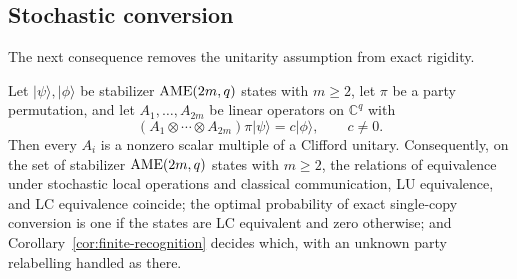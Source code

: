

\subsection{Stochastic conversion}
\label{subsec:stochastic-conversion}

The next consequence removes the unitarity assumption from exact rigidity.

\begin{corollary}
\label{cor:stochastic-conversion}
Let \(\lvert\psi\rangle,\lvert\phi\rangle\) be stabilizer
\(\mathrm{AME}(2m,q)\) states with \(m\geq2\), let \(\pi\) be a party
permutation, and let \(A_1,\ldots,A_{2m}\) be linear operators on
\(\mathbb C^q\) with
\[
 (A_1\otimes\cdots\otimes A_{2m})\pi\lvert\psi\rangle=c\lvert\phi\rangle,
 \qquad c\neq0 .
\]
Then every \(A_i\) is a nonzero scalar multiple of a Clifford unitary.
Consequently, on the set of stabilizer \(\mathrm{AME}(2m,q)\) states with
\(m\geq2\), the relations of equivalence under stochastic local operations
and classical communication, LU equivalence, and LC equivalence coincide;
the optimal probability of exact single-copy conversion is one if the
states are LC equivalent and zero otherwise; and
Corollary~\ref{cor:finite-recognition} decides which, with an unknown
party relabelling handled as there.
\end{corollary}

